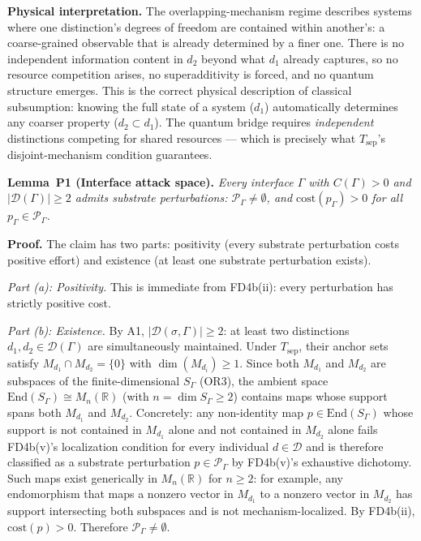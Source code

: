 \documentclass[11pt]{article}
\theoremstyle{remark}
\begin{document}
\medskip\noindent\textbf{Physical interpretation.}  The overlapping-mechanism regime describes systems where one distinction's degrees of freedom are contained within another's: a coarse-grained observable that is already determined by a finer one.  There is no independent information content in $d_2$ beyond what $d_1$ already captures, so no resource competition arises, no superadditivity is forced, and no quantum structure emerges.  This is the correct physical description of classical subsumption: knowing the full state of a system ($d_1$) automatically determines any coarser property ($d_2 \subset d_1$).  The quantum bridge requires \emph{independent} distinctions competing for shared resources --- which is precisely what $T_{\mathrm{sep}}$'s disjoint-mechanism condition guarantees.



\label{sec:P1P4_detail}
\smallskip\noindent\textbf{Lemma~P1 (Interface attack space).}
\emph{Every interface $\Gamma$ with $C(\Gamma) > 0$ and $|\mathcal{D}(\Gamma)| \ge 2$ admits substrate perturbations: $\mathcal{P}_\Gamma \ne \emptyset$, and $\mathrm{cost}(p_\Gamma) > 0$ for all $p_\Gamma \in \mathcal{P}_\Gamma$.}

\smallskip\noindent\textbf{Proof.}  The claim has two parts: positivity (every substrate perturbation costs positive effort) and existence (at least one substrate perturbation exists).

\textit{Part (a): Positivity.}  This is immediate from FD4b(ii): every perturbation has strictly positive cost.

\textit{Part (b): Existence.}  By A1, $|\mathcal{D}(\sigma,\Gamma)| \ge 2$: at least two distinctions $d_1, d_2 \in \mathcal{D}(\Gamma)$ are simultaneously maintained.  Under $T_{\mathrm{sep}}$, their anchor sets satisfy $M_{d_1} \cap M_{d_2} = \{0\}$ with $\dim(M_{d_i}) \ge 1$.  Since both $M_{d_1}$ and $M_{d_2}$ are subspaces of the finite-dimensional $S_\Gamma$ (OR3), the ambient space $\mathrm{End}(S_\Gamma) \cong M_n(\mathbb{R})$ (with $n = \dim S_\Gamma \ge 2$) contains maps whose support spans both $M_{d_1}$ and $M_{d_2}$.  Concretely: any non-identity map $p \in \mathrm{End}(S_\Gamma)$ whose support is not contained in $M_{d_1}$ alone and not contained in $M_{d_2}$ alone fails FD4b(v)'s localization condition for every individual $d \in \mathcal{D}$ and is therefore classified as a substrate perturbation $p \in \mathcal{P}_\Gamma$ by FD4b(v)'s exhaustive dichotomy.  Such maps exist generically in $M_n(\mathbb{R})$ for $n \ge 2$: for example, any endomorphism that maps a nonzero vector in $M_{d_1}$ to a nonzero vector in $M_{d_2}$ has support intersecting both subspaces and is not mechanism-localized.  By FD4b(ii), $\mathrm{cost}(p) > 0$.  Therefore $\mathcal{P}_\Gamma \ne \emptyset$.
\end{document}
